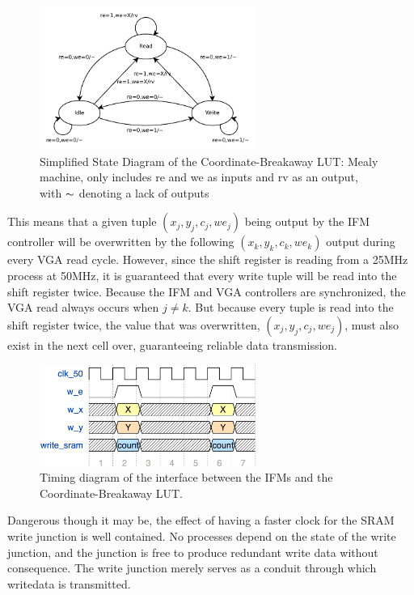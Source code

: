 \documentclass{article}
\begin{document}
\begin{figure}[H]
  \centering \includegraphics[width=200pt]{state_diagrams/clut.pdf}
  \caption{Simplified State Diagram of the Coordinate-Breakaway LUT:
    Mealy machine, only includes re and we as inputs and rv as an
    output, with $\thicksim$ denoting a lack of outputs}
\end{figure}

This means that a given tuple $(x_j, y_j, c_j, we_j)$ being output by
the IFM controller will be overwritten by the following $(x_k, y_k,
c_k, we_k)$ output during every VGA read cycle. However, since the
shift register is reading from a 25MHz process at 50MHz, it is
guaranteed that every write tuple will be read into the shift register
twice. Because the IFM and VGA controllers are synchronized, the VGA
read always occurs when $j \neq k$. But because every tuple is read
into the shift register twice, the value that was overwritten, $(x_j,
y_j, c_j, we_j)$, must also exist in the next cell over, guaranteeing
reliable data transmission.

\begin{figure}[H]
  \centering
  \includegraphics[width=200pt]{timing_diagrams/ifm_clut.pdf}
  \caption{Timing diagram of the interface between the IFMs and the
    Coordinate-Breakaway LUT.}
\end{figure}

Dangerous though it may be, the effect of having a faster clock for
the SRAM write junction is well contained.  No processes depend on the
state of the write junction, and the junction is free to produce
redundant write data without consequence. The write junction merely
serves as a conduit through which writedata is transmitted.
\end{document}
